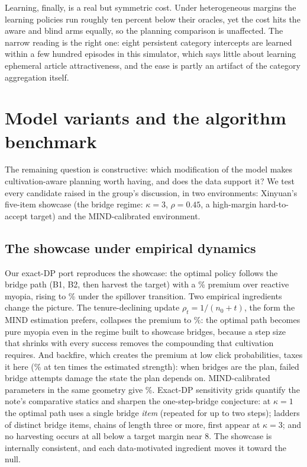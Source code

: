 \documentclass[11pt]{article}
\begin{document}
Learning, finally, is a real but symmetric cost. Under heterogeneous
margins the learning policies run roughly ten percent below their oracles,
yet the cost hits the aware and blind arms equally, so the planning
comparison is unaffected. The narrow reading is the right one: eight
persistent category intercepts are learned within a few hundred episodes in
this simulator, which says little about learning ephemeral article
attractiveness, and the ease is partly an artifact of the category
aggregation itself.


\section{Model variants and the algorithm benchmark}\label{sec:variants}

The remaining question is constructive: which modification of the model
makes cultivation-aware planning worth having, and does the data support
it? We test every candidate raised in the group's discussion, in two
environments: Xinyuan's five-item showcase (the bridge regime:
$\kappa=3$, $\rho=0.45$, a high-margin hard-to-accept target) and the
MIND-calibrated environment.

\subsection{The showcase under empirical dynamics}

Our exact-DP port reproduces the showcase: the optimal policy follows the
bridge path (B1, B2, then harvest the target) with a \toybase\% premium
over reactive myopia, rising to \toyspill\% under the spillover
transition. Two empirical ingredients change the picture. The
tenure-declining update $\rho_t=1/(n_0+t)$, the form the MIND estimation
prefers, collapses the premium to \toytenure\%: the optimal path becomes
pure myopia even in the regime built to showcase bridges, because a step
size that shrinks with every success removes the compounding that
cultivation requires. And backfire, which creates the premium at low
click probabilities, taxes it here (\toybackten\% at ten times the
estimated strength): when bridges are the plan, failed bridge attempts
damage the state the plan depends on. MIND-calibrated parameters in the
same geometry give \toymind\%. Exact-DP sensitivity grids quantify the
note's comparative statics and sharpen the one-step-bridge conjecture: at
$\kappa=1$ the optimal path uses a single bridge \emph{item} (repeated
for up to two steps); ladders of distinct bridge items, chains of length
three or more, first appear at $\kappa=3$; and no harvesting occurs at
all below a target margin near 8. The showcase is
internally consistent, and each data-motivated ingredient moves it
toward the null.
\end{document}
